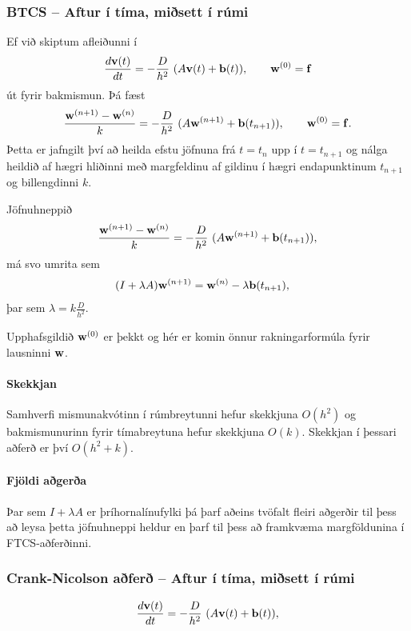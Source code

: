 \documentclass[icelandic,a4paper,12pt]{article}
\begin{document}
 
\subsubsection{BTCS -- Aftur í tíma, miðsett í rúmi}
Ef við skiptum afleiðunni í 
$$ 
 \frac{d \mbox{${\bf v}$}(t)}{d t} =  -\frac{D}{h^2}\  (A\mbox{${\bf v}$}(t) + \mbox{${\bf b}$}(t)), \qquad \mbox{${\bf w}$}^{(0)}=\mbox{${\bf f}$}
$$
út fyrir bakmismun. Þá fæst
$$ 
 \frac{\mbox{${\bf w}$}^{(n+1)} - \mbox{${\bf w}$}^{(n)}}{ k} =  -\frac{D}{h^2}\  (A\mbox{${\bf w}$}^{(n+1)} + \mbox{${\bf b}$}(t_{n+1})), 
 \qquad \mbox{${\bf w}$}^{(0)}=\mbox{${\bf f}$}.
$$\pause
Þetta er jafngilt því að heilda efstu jöfnuna frá $t=t_n$ upp í $t=t_{n+1}$ og
nálga heildið af hægri hliðinni með margfeldinu af gildinu í hægri endapunktinum 
$t_{n+1}$ og billengdinni $k$. \pause


 
 Jöfnuhneppið
 $$ 
 \frac{\mbox{${\bf w}$}^{(n+1)} - \mbox{${\bf w}$}^{(n)}}{ k} =  -\frac{D}{h^2}\  (A\mbox{${\bf w}$}^{(n+1)} + \mbox{${\bf b}$}(t_{n+1})), 
$$
má svo umrita sem
\begin{align*}
 (I+\lambda A)\mbox{${\bf w}$}^{(n+1)} &= \mbox{${\bf w}$}^{(n)}  - \lambda \mbox{${\bf b}$}(t_{n+1}), 
\end{align*}
þar sem $\lambda = k\frac{D}{h^2}$. \pause
 
 Upphafsgildið $\mbox{${\bf w}$}^{(0)}$ er þekkt og hér er komin önnur rakningarformúla
 fyrir lausninni $\mbox{${\bf w}$}$.  \pause
 
\paragraph{Skekkjan}
  Samhverfi mismunakvótinn í rúmbreytunni hefur skekkjuna
 $O(h^2)$ og bakmismunurinn fyrir tímabreytuna hefur skekkjuna $O(k)$. 
 Skekkjan í þessari aðferð er því $O(h^2 + k)$.
 
 
\paragraph{Fjöldi aðgerða}
  Þar sem $I+\lambda A$ er þríhornalínufylki þá þarf aðeins tvöfalt fleiri
  aðgerðir til þess að leysa þetta jöfnuhneppi heldur en þarf til þess að framkvæma margföldunina
  í FTCS-aðferðinni.
 

 
 
 
\subsubsection{Crank-Nicolson aðferð -- Aftur í tíma, miðsett í rúmi}
$$ 
 \frac{d \mbox{${\bf v}$}(t)}{d t} =  -\frac{D}{h^2}\  (A\mbox{${\bf v}$}(t) + \mbox{${\bf b}$}(t)),
$$
\end{document}
